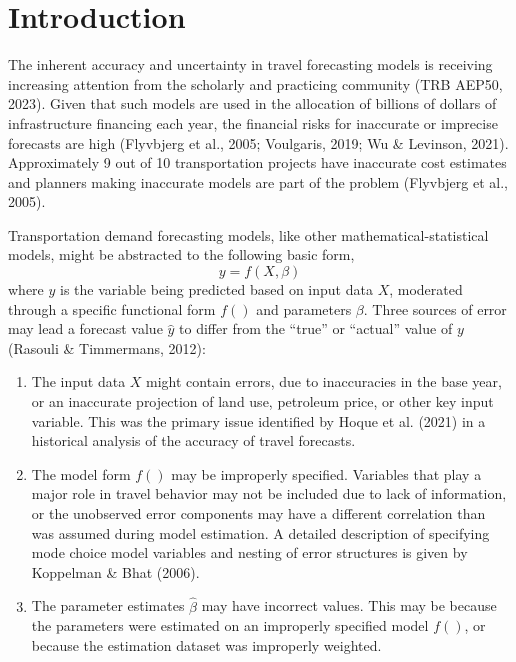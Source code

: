 \documentclass[fancy, masters]{byuthesis}
\begin{document}
	\tableofcontents
	\cleardoublepage

	\listoffigures
	\cleardoublepage

	\listoftables
	\cleardoublepage

	
	\cleardoublepage

	\mainmatter

\hypertarget{introduction}{%
\chapter{Introduction}\label{introduction}}

The inherent accuracy and uncertainty in travel forecasting models is receiving increasing attention from the scholarly and practicing community (TRB AEP50, 2023). Given that such models are used in the allocation of billions of dollars of infrastructure financing each year, the financial risks for inaccurate or imprecise forecasts are high (Flyvbjerg et al., 2005; Voulgaris, 2019; Wu \& Levinson, 2021). Approximately 9 out of 10 transportation projects have inaccurate cost estimates and planners making inaccurate models are part of the problem (Flyvbjerg et al., 2005).

Transportation demand forecasting models, like other mathematical-statistical models, might be abstracted to the following basic form,
\begin{equation}
y = f(X, \beta)
\end{equation}
where \(y\) is the variable being predicted based on input data \(X\), moderated through a specific functional form \(f()\) and parameters \(\beta\). Three sources of error may lead a forecast value \(\hat{y}\) to differ from the ``true'' or ``actual'' value of \(y\) (Rasouli \& Timmermans, 2012):

\begin{enumerate}
\def\labelenumi{\arabic{enumi}.}
\item
  The input data \(X\) might contain errors, due to inaccuracies in the base year, or an inaccurate projection of land use, petroleum price, or other key input variable. This was the primary issue identified by Hoque et al. (2021) in a historical analysis of the accuracy of travel forecasts.
\item
  The model form \(f()\) may be improperly specified. Variables that play a major role in travel behavior may not be included due to lack of information, or the unobserved error components may have a different correlation than was assumed during model estimation. A detailed description of specifying mode choice model variables and nesting of error structures is given by Koppelman \& Bhat (2006).
\item
  The parameter estimates \(\hat{\beta}\) may have incorrect values. This may be because the parameters were estimated on an improperly specified model \(f()\), or because the estimation dataset was improperly weighted.
\end{enumerate}
\end{document}
